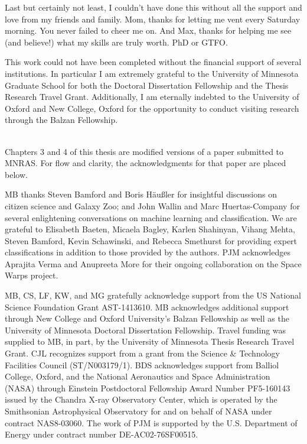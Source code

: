 Last but certainly not least, I couldn't have done this without all the support and love from my friends and family. Mom, thanks for letting me vent every Saturday morning. You never failed to cheer me on. And Max, thanks for helping me see (and believe!) what my skills are truly worth. PhD or GTFO. 


This work could not have been completed without the financial support of several institutions. In particular I am extremely grateful to the University of Minnesota Graduate School for both the Doctoral Dissertation Fellowship and the Thesis Research Travel Grant. Additionally, I am eternally indebted to the University of Oxford and New College, Oxford for the opportunity to conduct visiting research through the Balzan Fellowship. \\~



\noindent Chapters 3 and 4 of this thesis are modified versions of a paper submitted to MNRAS. For flow and clarity, the acknowledgments for that paper are placed below. 

MB thanks Steven Bamford and Boris H{\"a}u{\ss}ler for insightful discussions on citizen science and Galaxy Zoo; and John Wallin and Marc Huertas-Company for several enlightening conversations on machine learning and classification. 
We are grateful to Elisabeth Baeten, Micaela Bagley, Karlen Shahinyan, Vihang Mehta, Steven Bamford, Kevin Schawinski, and Rebecca Smethurst for providing expert classifications in addition to those provided by the authors. PJM acknowledges Aprajita Verma and Anupreeta More for their ongoing collaboration on the Space Warps project. 

MB, CS, LF, KW, and MG gratefully acknowledge support from the US National Science
Foundation Grant AST-1413610.  MB acknowledges additional support 
through New College and Oxford University's Balzan Fellowship as well as the University
of Minnesota Doctoral Dissertation Fellowship. Travel funding was supplied 
to MB, in part, by the University of Minnesota Thesis Research Travel Grant. CJL recognizes support from a grant from the Science \& Technology Facilities Council (ST/N003179/1). 
BDS acknowledges support from Balliol College, Oxford, and the National Aeronautics and Space Administration (NASA) through Einstein Postdoctoral Fellowship Award Number PF5-160143 issued by the Chandra X-ray Observatory Center, which is operated by the Smithsonian Astrophysical Observatory for and on behalf of NASA under contract NAS8-03060. The work of PJM is supported by the U.S. Department of Energy under contract number DE-AC02-76SF00515.

